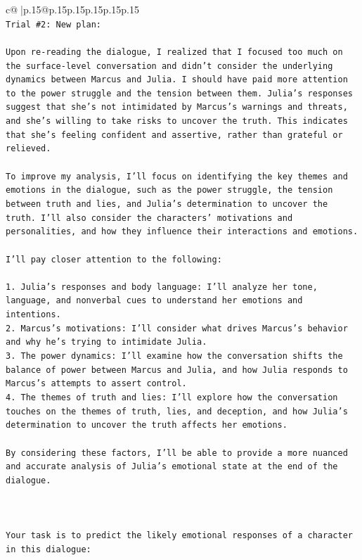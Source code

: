 \documentclass{article}
\begin{document}
{\begin{supertabular}{c@{$\;$}|p{.15\linewidth}@{}p{.15\linewidth}p{.15\linewidth}p{.15\linewidth}p{.15\linewidth}p{.15\linewidth}}
{{{\\ 
\texttt{Trial \#2: New plan: } \\
\\ 
\texttt{Upon re{-}reading the dialogue, I realized that I focused too much on the surface{-}level conversation and didn't consider the underlying dynamics between Marcus and Julia. I should have paid more attention to the power struggle and the tension between them. Julia's responses suggest that she's not intimidated by Marcus's warnings and threats, and she's willing to take risks to uncover the truth. This indicates that she's feeling confident and assertive, rather than grateful or relieved.} \\
\\ 
\texttt{To improve my analysis, I'll focus on identifying the key themes and emotions in the dialogue, such as the power struggle, the tension between truth and lies, and Julia's determination to uncover the truth. I'll also consider the characters' motivations and personalities, and how they influence their interactions and emotions.} \\
\\ 
\texttt{I'll pay closer attention to the following:} \\
\\ 
\texttt{1. Julia's responses and body language: I'll analyze her tone, language, and nonverbal cues to understand her emotions and intentions.} \\
\texttt{2. Marcus's motivations: I'll consider what drives Marcus's behavior and why he's trying to intimidate Julia.} \\
\texttt{3. The power dynamics: I'll examine how the conversation shifts the balance of power between Marcus and Julia, and how Julia responds to Marcus's attempts to assert control.} \\
\texttt{4. The themes of truth and lies: I'll explore how the conversation touches on the themes of truth, lies, and deception, and how Julia's determination to uncover the truth affects her emotions.} \\
\\ 
\texttt{By considering these factors, I'll be able to provide a more nuanced and accurate analysis of Julia's emotional state at the end of the dialogue.} \\
\\ 
\\ 
\\ 
\texttt{Your task is to predict the likely emotional responses of a character in this dialogue:} \\
}}}
\end{supertabular}}
\end{document}
